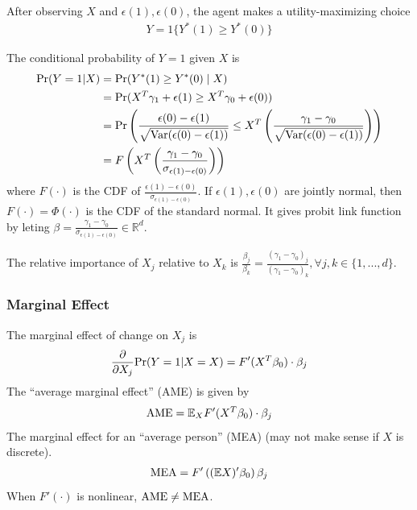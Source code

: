 \documentclass[11pt]{elegantbook}
\begin{document}
After observing $X$ and $\epsilon(1), \epsilon(0)$, the agent makes a utility-maximizing choice
\begin{equation}
    \begin{aligned}
        Y=1\{Y^*(1)\geq Y^*(0)\}
    \end{aligned}
    \nonumber
\end{equation}

The conditional probability of $Y = 1$ given $X$ is
\begin{equation}
    \begin{aligned}
        \textnormal{Pr}(Y=1|X)&=\textnormal{Pr}(Y^*(1)\geq Y^*(0)\mid X)\\
        &=\textnormal{Pr}(X^T\gamma_1+\epsilon(1)\geq X^T\gamma_0+\epsilon(0))\\
        &=\textnormal{Pr}\left(\frac{\epsilon(0)-\epsilon(1)}{\sqrt{\textnormal{Var}(\epsilon(0)-\epsilon(1))}}\leq X^T\left(\frac{\gamma_1-\gamma_0}{\sqrt{\textnormal{Var}(\epsilon(0)-\epsilon(1))}}\right)\right)\\
        &=F\left(X^T\left(\frac{\gamma_1-\gamma_0}{\sigma_{\epsilon(1)-\epsilon(0)}}\right)\right)
    \end{aligned}
    \nonumber
\end{equation}
where $F(\cdot)$ is the CDF of $\frac{\epsilon(1)-\epsilon(0)}{\sigma_{\epsilon(1)-\epsilon(0)}}$. If $\epsilon(1),\epsilon(0)$ are jointly normal, then $F(\cdot)=\Phi(\cdot)$ is the CDF of the standard normal. It gives probit link function by leting $\beta=\frac{\gamma_1-\gamma_0}{\sigma_{\epsilon(1)-\epsilon(0)}}\in \mathbb{R}^d$.

The relative importance of $X_j$ relative to $X_k$ is $\frac{\beta_j}{\beta_k}=\frac{(\gamma_1-\gamma_0)_j}{(\gamma_1-\gamma_0)_k},\forall j,k\in \{1,...,d\}$.


\subsubsection*{Marginal Effect}
The marginal effect of change on $X_j$ is
\begin{equation}
    \begin{aligned}
        \frac{\partial}{\partial X_j}\textnormal{Pr}(Y=1|X=X)=F'(X^T\beta_0)\cdot\beta_j
    \end{aligned}
    \nonumber
\end{equation}
The ``average marginal effect'' (AME) is given by
\begin{equation}
    \begin{aligned}
        \textnormal{AME}=\mathbb{E}_X F'(X^T\beta_0)\cdot\beta_j\\
    \end{aligned}
    \nonumber
\end{equation}
The marginal effect for an ``average person'' (MEA) (may not make sense if $X$ is discrete).
\begin{equation}
    \begin{aligned}
        \textnormal{MEA}=F'\left((\mathbb{E}X)'\beta_0\right)\beta_j
    \end{aligned}
    \nonumber
\end{equation}
When $F'(\cdot)$ is nonlinear, $\textnormal{AME}\neq \textnormal{MEA}$.
\end{document}

